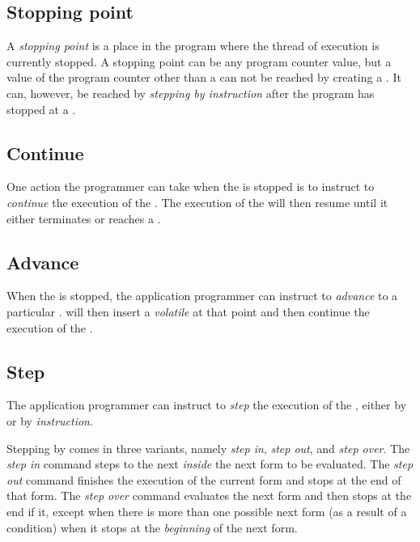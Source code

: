 %
\def\Stoppingpoint{Stopping point}%
\def\stoppingpoint{stopping point}%
\def\stoppingpoints{stopping points}%
\subsection{\Stoppingpoint{}}

A \emph{\stoppingpoint{}} is a place in the program where the thread
of execution is currently stopped.  A \stoppingpoint{} can be any
program counter value, but a value of the program counter other than
a \pollpoint{} can not be reached by creating a \breakpoint{}.  It
can, however, be reached by \emph{stepping by instruction} after the
program has stopped at a \pollpoint{}.

%
\def\Continue{Continue}%
\def\continue{continue}%
\def\continues{continues}%
\subsection{\Continue{}}

One action the programmer can take when the \applicationthread{} is
stopped is to instruct \sysname{} to \emph{\continue{}} the execution
of the \applicationthread{}.  The execution of the
\applicationthread{} will then resume until it either terminates or
reaches a \breakpoint{}.

%
\def\Dvance{Advance}%
\def\dvance{advance}%
\def\dvances{advances}%
\subsection{\Dvance{}}

When the \applicationthread{} is stopped, the application programmer
can instruct \sysname{} to \emph{\dvance{}} to a particular
\pollpoint{}.  \sysname{} will then insert a \emph{volatile
  \breakpoint{}} at that point and then \continue{} the execution of
the \applicationthread{}.

%
\def\Step{Step}%
\def\step{step}%
\def\steps{steps}%
\subsection{\Step{}}

The application programmer can instruct \sysname{} to \emph{\step{}}
the execution of the \applicationthread{}, either by \emph{\pollpoint}
or by \emph{instruction}.  

Stepping by \pollpoint{} comes in three variants, namely \emph{\step{}
  in}, \emph{\step{} out}, and \emph{\step{} over}.  The \emph{\step{}
  in} command steps to the next \pollpoint{} \emph{inside} the next form
to be evaluated.  The \emph{\step{} out} command finishes the
execution of the current form and stops at the end of that form.  The
\emph{\step{} over} command evaluates the next form and then stops at
the end if it, except when there is more than one possible next form
(as a result of a condition) when it stops at the \emph{beginning} of
the next form.

